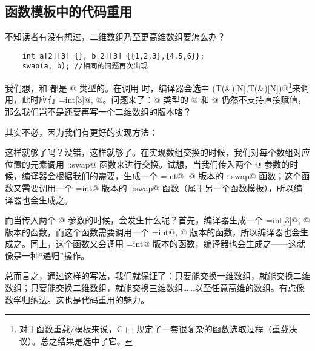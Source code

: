 \subsection*{函数模板中的代码重用}
不知读者有没有想过，二维数组乃至更高维数组要怎么办？
\begin{lstlisting}
    int a[2][3] {}, b[2][3] {{1,2,3},{4,5,6}};
    swap(a, b); //相同的问题再次出现
\end{lstlisting}\par
我们想，\lstinline@a@ 和 \lstinline@b@ 都是 \lstinline@int[2][3]@ 类型的。在调用 \lstinline@swap@ 时，编译器会选中 \lstinline@swap(T(&)[N],T(&)[N])@\footnote{对于函数重载/模板来说，C++规定了一套很复杂的函数选取过程（重载决议）。总之结果是选中了它。}来调用，此时应有 \lstinline@T=int[3]@, @。问题来了：\lstinline@int[3]@ 类型的 \lstinline@a[i]@ 和 \lstinline@b[i]@ 仍然不支持直接赋值，那么我们岂不是还要再写一个二维数组的版本咯？\par
其实不必，因为我们有更好的实现方法：

这样就够了吗？没错，这样就够了。在实现数组交换的时候，我们对每个数组对应位置的元素调用 \lstinline@user::swap@ 函数来进行交换。试想，当我们传入两个 \lstinline@int[3]@ 参数的时候，编译器会根据我们的需要，生成一个 \lstinline@T=int@, @ 版本的 \lstinline@user::swap@ 函数；这个函数又需要调用一个 \lstinline@T=int@ 版本的 \lstinline@user::swap@ 函数（属于另一个函数模板），所以编译器也会生成之。\par
而当传入两个 \lstinline@int[2][3]@ 参数的时候，会发生什么呢？首先，编译器生成一个 \lstinline@T=int[3]@, @ 版本的函数，而这个函数需要调用一个 \lstinline@T=int@, @ 版本的函数，所以编译器也会生成之。同上，这个函数又会调用 \lstinline@T=int@ 版本的函数，编译器也会生成之——这就像是一种``递归''操作。\par
总而言之，通过这样的写法，我们就保证了：只要能交换一维数组，就能交换二维数组；只要能交换二维数组，就能交换三维数组……以至任意高维的数组。有点像数学归纳法。这也是代码重用的魅力。\par
